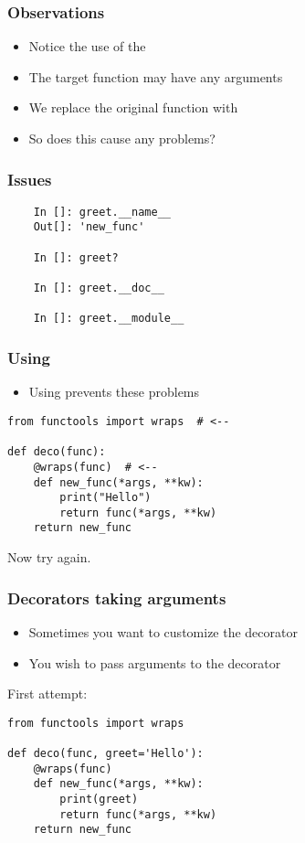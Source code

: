 \documentclass[14pt,compress,aspectratio=169]{beamer}
\begin{document}
\begin{frame}
  \frametitle{Observations}
  \begin{itemize}
  \item Notice the use of the 
  \item The target function may have any arguments
  \item We replace the original function with 
  \item So does this cause any problems?
  \end{itemize}
\end{frame}

\begin{frame}[fragile]
  \frametitle{Issues}
  \begin{lstlisting}
    In []: greet.__name__
    Out[]: 'new_func'

    In []: greet?

    In []: greet.__doc__

    In []: greet.__module__
  \end{lstlisting}
\end{frame}

\begin{frame}[fragile]
  \frametitle{Using }
  \begin{itemize}
  \item Using  prevents these problems
  \end{itemize}

  \begin{lstlisting}
from functools import wraps  # <--

def deco(func):
    @wraps(func)  # <--
    def new_func(*args, **kw):
        print("Hello")
        return func(*args, **kw)
    return new_func
\end{lstlisting}

Now try again.
\end{frame}


\begin{frame}[fragile]
  \frametitle{Decorators taking arguments}
  \begin{itemize}
  \item Sometimes you want to customize the decorator
  \item You wish to pass arguments to the decorator
  \end{itemize}
\pause
First attempt:
  \begin{lstlisting}
from functools import wraps

def deco(func, greet='Hello'):
    @wraps(func)
    def new_func(*args, **kw):
        print(greet)
        return func(*args, **kw)
    return new_func
\end{lstlisting}
\end{frame}
\end{document}
